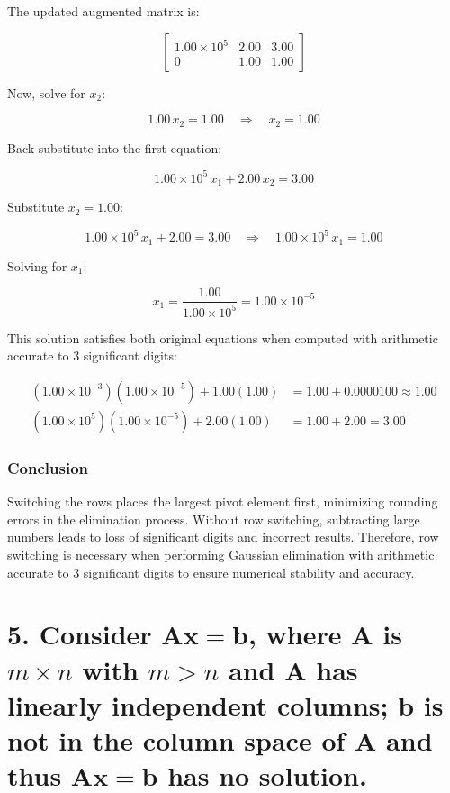 \documentclass{article}
\newcommand{\mA}{\mathbf{A}}
\newcommand{\vx}{\mathbf{x}}
\newcommand{\vb}{\mathbf{b}}
\begin{document}
{The updated augmented matrix is:

\[
\left[ \begin{array}{cc|c}
1.00 \times 10^{5} & 2.00 & 3.00 \\
0 & 1.00 & 1.00
\end{array} \right]
\]

Now, solve for \( x_2 \):

\[
1.00\, x_2 = 1.00 \quad \Rightarrow \quad x_2 = 1.00
\]

Back-substitute into the first equation:

\[
1.00 \times 10^{5}\, x_1 + 2.00\, x_2 = 3.00
\]

Substitute \( x_2 = 1.00 \):

\[
1.00 \times 10^{5}\, x_1 + 2.00 = 3.00 \quad \Rightarrow \quad 1.00 \times 10^{5}\, x_1 = 1.00
\]

Solving for \( x_1 \):

\[
x_1 = \dfrac{1.00}{1.00 \times 10^{5}} = 1.00 \times 10^{-5}
\]

This solution satisfies both original equations when computed with arithmetic accurate to 3 significant digits:

\[
\begin{aligned}
(1.00 \times 10^{-3})(1.00 \times 10^{-5}) + 1.00 (1.00) &= 1.00 + 0.0000100 \approx 1.00 \\
(1.00 \times 10^{5})(1.00 \times 10^{-5}) + 2.00 (1.00) &= 1.00 + 2.00 = 3.00
\end{aligned}
\]

\subsubsection*{Conclusion}

Switching the rows places the largest pivot element first, minimizing rounding errors in the elimination process. Without row switching, subtracting large numbers leads to loss of significant digits and incorrect results. Therefore, row switching is necessary when performing Gaussian elimination with arithmetic accurate to 3 significant digits to ensure numerical stability and accuracy.
    
}

\section*{5. Consider $\mA\vx = \vb$, where $\mA$ is $m \times n$ with $m > n$ and $\mA$ has linearly independent columns; $\vb$ is not in the column space of $\mA$ and thus $\mA\vx = \vb$ has no solution.}
\end{document}
